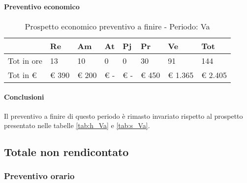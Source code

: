 			\paragraph{Preventivo economico}
				\begin{table}[H] \begin{center} \begin{tabular}{llllllll}
										\toprule
											&	\textbf{Re}	&	\textbf{Am}	&	\textbf{At}	&	\textbf{Pj}	&	\textbf{Pr}	&	\textbf{Ve}	&	\textbf{Tot}	 \\

										\midrule
										Tot in ore	&	13	&	10	&	0	&	0	&	30	&	91	&	144	 \\


										Tot in €	&	 €     390 	 & 	 €      200 	 & 	 €         -   	 & 	 €         -   	 & 	 €    450 	 & 	 €  1.365 	 & 	 €     2.405 	 \\
										\bottomrule
										\end{tabular} \end{center} \caption{Prospetto economico preventivo a finire - Periodo:
										Va
										}\end{table}
			\paragraph{Conclusioni} Il preventivo a finire di questo periodo è rimasto invariato rispetto al prospetto presentato nelle tabelle \ref{tab:h_Va} e \ref{tab:s_Va}.
	\newpage
	\subsection{Totale non rendicontato}
		\subsubsection{Preventivo orario}


